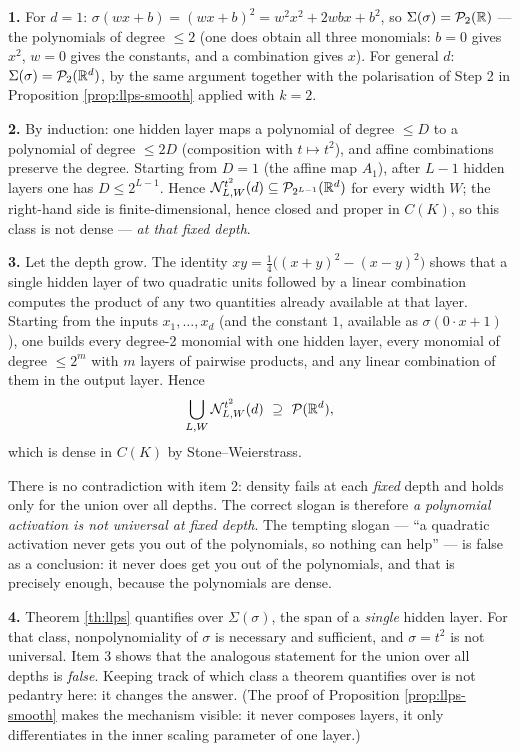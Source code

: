 \documentclass[11pt,a4paper]{article}
\begin{document}
\textbf{1.} For $d = 1$: $\sigma(wx+b) = (wx+b)^2 = w^2x^2 + 2wbx + b^2$, so
$\Sigma(\sigma) = \mathcal{P}_2(\mathbb{R})$ --- the polynomials of degree $\le 2$ (one does obtain all three
monomials: $b=0$ gives $x^2$, $w=0$ gives the constants, and a combination gives $x$). For general
$d$: $\Sigma(\sigma) = \mathcal{P}_2(\mathbb{R}^d)$, by the same argument together with the polarisation of Step 2
in Proposition \ref{prop:llps-smooth} applied with $k = 2$.

\textbf{2.} By induction: one hidden layer maps a polynomial of degree $\le D$ to a polynomial of
degree $\le 2D$ (composition with $t \mapsto t^2$), and affine combinations preserve the degree.
Starting from $D = 1$ (the affine map $A_1$), after $L-1$ hidden layers one has $D \le 2^{L-1}$.
Hence $\mathcal{N}^{t^2}_{L,W}(d) \subseteq \mathcal{P}_{2^{L-1}}(\mathbb{R}^d)$ for every width $W$; the right-hand side is
finite-dimensional, hence closed and proper in $C(K)$, so this class is not dense --- \emph{at that
fixed depth}.

\textbf{3.} Let the depth grow. The identity $xy = \tfrac14\big((x+y)^2 - (x-y)^2\big)$ shows that
a single hidden layer of two quadratic units followed by a linear combination computes the product
of any two quantities already available at that layer. Starting from the inputs
$x_1,\dots,x_d$ (and the constant $1$, available as $\sigma(0\cdot x + 1)$), one builds every
degree-2 monomial with one hidden layer, every monomial of degree $\le 2^m$ with $m$ layers of
pairwise products, and any linear combination of them in the output layer. Hence
\[
\bigcup_{L,W} \mathcal{N}^{t^2}_{L,W}(d) \ \supseteq\ \mathcal{P}(\mathbb{R}^d),
\]
which is dense in $C(K)$ by Stone--Weierstrass.

There is no contradiction with item 2: density fails at each \emph{fixed} depth and holds only for
the union over all depths. The correct slogan is therefore \emph{a polynomial activation is not
universal at fixed depth}. The tempting slogan --- ``a quadratic activation never gets you out of
the polynomials, so nothing can help'' --- is false as a conclusion: it never does get you out of
the polynomials, and that is precisely enough, because the polynomials are dense.

\textbf{4.} Theorem \ref{th:llps} quantifies over $\Sigma(\sigma)$, the span of a \emph{single}
hidden layer. For that class, nonpolynomiality of $\sigma$ is necessary and sufficient, and
$\sigma = t^2$ is not universal. Item 3 shows that the analogous statement for the union over all
depths is \emph{false}. Keeping track of which class a theorem quantifies over is not pedantry
here: it changes the answer. (The proof of Proposition \ref{prop:llps-smooth} makes the mechanism
visible: it never composes layers, it only differentiates in the inner scaling parameter of one
layer.)
\end{document}
